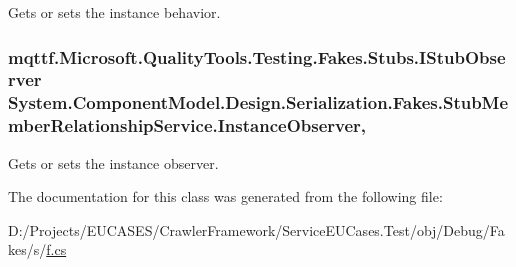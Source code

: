 Gets or sets the instance behavior.

\hypertarget{class_system_1_1_component_model_1_1_design_1_1_serialization_1_1_fakes_1_1_stub_member_relationship_service_a939f93aadef9abc0e2a4233174014145}{
\subsubsection[{Instance\-Observer}]{\setlength{\rightskip}{0pt plus 5cm}mqttf.\-Microsoft.\-Quality\-Tools.\-Testing.\-Fakes.\-Stubs.\-I\-Stub\-Observer System.\-Component\-Model.\-Design.\-Serialization.\-Fakes.\-Stub\-Member\-Relationship\-Service.\-Instance\-Observer\hspace{0.3cm}{\ttfamily [get]}, {\ttfamily [set]}}}\label{class_system_1_1_component_model_1_1_design_1_1_serialization_1_1_fakes_1_1_stub_member_relationship_service_a939f93aadef9abc0e2a4233174014145}


Gets or sets the instance observer.



The documentation for this class was generated from the following file\-:\begin{DoxyCompactItemize}
\item 
D\-:/\-Projects/\-E\-U\-C\-A\-S\-E\-S/\-Crawler\-Framework/\-Service\-E\-U\-Cases.\-Test/obj/\-Debug/\-Fakes/s/\hyperlink{s_2f_8cs}{f.\-cs}\end{DoxyCompactItemize}
